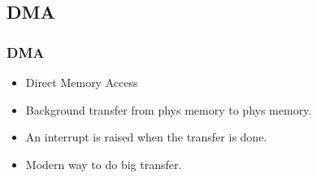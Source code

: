 \subsection{DMA}
\begin{frame}
\frametitle{DMA}
        \begin{itemize}
        \item Direct Memory Access
        \item Background transfer from phys memory to phys memory.
        \item An interrupt is raised when the transfer is done.
        \item Modern way to do big transfer.
        \end{itemize}
\end{frame}

\begin{frame}
\begin{center}
\begin{overlayarea}{10cm}{10cm}
\end{overlayarea}
\end{center}
\end{frame}

